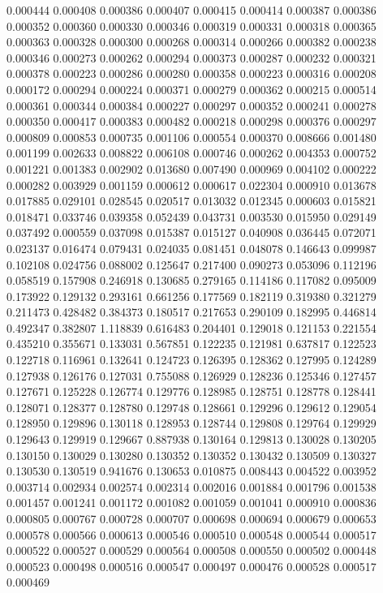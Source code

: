 0.000444
0.000408
0.000386
0.000407
0.000415
0.000414
0.000387
0.000386
0.000352
0.000360
0.000330
0.000346
0.000319
0.000331
0.000318
0.000365
0.000363
0.000328
0.000300
0.000268
0.000314
0.000266
0.000382
0.000238
0.000346
0.000273
0.000262
0.000294
0.000373
0.000287
0.000232
0.000321
0.000378
0.000223
0.000286
0.000280
0.000358
0.000223
0.000316
0.000208
0.000172
0.000294
0.000224
0.000371
0.000279
0.000362
0.000215
0.000514
0.000361
0.000344
0.000384
0.000227
0.000297
0.000352
0.000241
0.000278
0.000350
0.000417
0.000383
0.000482
0.000218
0.000298
0.000376
0.000297
0.000809
0.000853
0.000735
0.001106
0.000554
0.000370
0.008666
0.001480
0.001199
0.002633
0.008822
0.006108
0.000746
0.000262
0.004353
0.000752
0.001221
0.001383
0.002902
0.013680
0.007490
0.000969
0.004102
0.000222
0.000282
0.003929
0.001159
0.000612
0.000617
0.022304
0.000910
0.013678
0.017885
0.029101
0.028545
0.020517
0.013032
0.012345
0.000603
0.015821
0.018471
0.033746
0.039358
0.052439
0.043731
0.003530
0.015950
0.029149
0.037492
0.000559
0.037098
0.015387
0.015127
0.040908
0.036445
0.072071
0.023137
0.016474
0.079431
0.024035
0.081451
0.048078
0.146643
0.099987
0.102108
0.024756
0.088002
0.125647
0.217400
0.090273
0.053096
0.112196
0.058519
0.157908
0.246918
0.130685
0.279165
0.114186
0.117082
0.095009
0.173922
0.129132
0.293161
0.661256
0.177569
0.182119
0.319380
0.321279
0.211473
0.428482
0.384373
0.180517
0.217653
0.290109
0.182995
0.446814
0.492347
0.382807
1.118839
0.616483
0.204401
0.129018
0.121153
0.221554
0.435210
0.355671
0.133031
0.567851
0.122235
0.121981
0.637817
0.122523
0.122718
0.116961
0.132641
0.124723
0.126395
0.128362
0.127995
0.124289
0.127938
0.126176
0.127031
0.755088
0.126929
0.128236
0.125346
0.127457
0.127671
0.125228
0.126774
0.129776
0.128985
0.128751
0.128778
0.128441
0.128071
0.128377
0.128780
0.129748
0.128661
0.129296
0.129612
0.129054
0.128950
0.129896
0.130118
0.128953
0.128744
0.129808
0.129764
0.129929
0.129643
0.129919
0.129667
0.887938
0.130164
0.129813
0.130028
0.130205
0.130150
0.130029
0.130280
0.130352
0.130352
0.130432
0.130509
0.130327
0.130530
0.130519
0.941676
0.130653
0.010875
0.008443
0.004522
0.003952
0.003714
0.002934
0.002574
0.002314
0.002016
0.001884
0.001796
0.001538
0.001457
0.001241
0.001172
0.001082
0.001059
0.001041
0.000910
0.000836
0.000805
0.000767
0.000728
0.000707
0.000698
0.000694
0.000679
0.000653
0.000578
0.000566
0.000613
0.000546
0.000510
0.000548
0.000544
0.000517
0.000522
0.000527
0.000529
0.000564
0.000508
0.000550
0.000502
0.000448
0.000523
0.000498
0.000516
0.000547
0.000497
0.000476
0.000528
0.000517
0.000469
